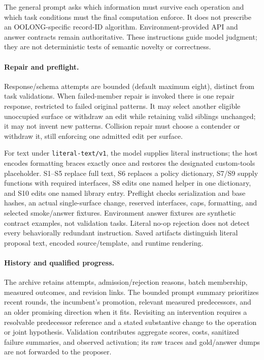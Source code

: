 The general prompt asks which information must survive each operation and which
task conditions must the final computation enforce. It does not prescribe an
OOLONG-specific record-ID algorithm. Environment-provided API and answer
contracts remain authoritative. These instructions guide model judgment; they
are not deterministic tests of semantic novelty or correctness.

\paragraph{Repair and preflight.}
Response/schema attempts are bounded (default maximum eight), distinct from
task validations. When failed-member repair is invoked there is one repair
response, restricted to failed original patterns. It may select another eligible
unoccupied surface or withdraw an edit while retaining valid siblings unchanged;
it may not invent new patterns. Collision repair must choose a contender or
withdraw it, still enforcing one admitted edit per surface.

For text under \texttt{literal-text/v1}, the model supplies literal instructions;
the host encodes formatting braces exactly once and restores the designated
custom-tools placeholder. S1--S5 replace full text, S6 replaces a policy
dictionary, S7/S9 supply functions with required interfaces, S8 edits one named
helper in one dictionary, and S10 edits one named library entry. Preflight checks
serialization and base hashes, an actual single-surface change, reserved
interfaces, caps, formatting, and selected smoke/answer fixtures. Environment
answer fixtures are synthetic contract examples, not validation tasks. Literal
no-op rejection does not detect every behaviorally redundant instruction.
Saved artifacts distinguish literal proposal text, encoded source/template, and
runtime rendering.

\paragraph{History and qualified progress.}
The archive retains attempts, admission/rejection reasons, batch membership,
measured outcomes, and revision links. The bounded prompt summary prioritizes
recent rounds, the incumbent's promotion, relevant measured predecessors, and an
older promising direction when it fits. Revisiting an intervention requires a
resolvable predecessor reference and a stated substantive change to the operation
or joint hypothesis. Validation contributes aggregate scores, costs, sanitized
failure summaries, and observed activation; its raw traces and gold/answer dumps
are not forwarded to the proposer.

